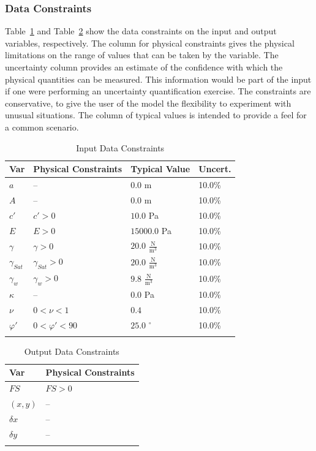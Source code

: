 \documentclass[12pt]{article}
\begin{document}
\subsubsection{Data Constraints}
\label{Sec:DataConstraints}
Table~\ref{Table:InDataConstraints} and Table~\ref{Table:OutDataConstraints} show the data constraints on the input and output variables, respectively. The column for physical constraints gives the physical limitations on the range of values that can be taken by the variable. The uncertainty column provides an estimate of the confidence with which the physical quantities can be measured. This information would be part of the input if one were performing an uncertainty quantification exercise. The constraints are conservative, to give the user of the model the flexibility to experiment with unusual situations. The column of typical values is intended to provide a feel for a common scenario.
\begin{longtable}{l l l l}
\toprule
Var & Physical Constraints & Typical Value & Uncert.
\\
\midrule
$a$ & -- & $0.0$ m & 10.0\%
\\
$A$ & -- & $0.0$ m & 10.0\%
\\
$c'$ & $c'>0$ & $10.0$ Pa & 10.0\%
\\
$E$ & $E>0$ & $15000.0$ Pa & 10.0\%
\\
$γ$ & $γ>0$ & $20.0$ $\frac{\text{N}}{\text{m}^{3}}$ & 10.0\%
\\
${γ_{Sat}}$ & ${γ_{Sat}}>0$ & $20.0$ $\frac{\text{N}}{\text{m}^{3}}$ & 10.0\%
\\
${γ_{w}}$ & ${γ_{w}}>0$ & $9.8$ $\frac{\text{N}}{\text{m}^{3}}$ & 10.0\%
\\
$κ$ & -- & $0.0$ Pa & 10.0\%
\\
$ν$ & $0<ν<1$ & $0.4$ & 10.0\%
\\
$φ'$ & $0<φ'<90$ & $25.0$ ${}^{\circ}$ & 10.0\%
\\
\bottomrule
\caption{Input Data Constraints}
\label{Table:InDataConstraints}
\end{longtable}
\begin{longtable}{l l}
\toprule
Var & Physical Constraints
\\
\midrule
$FS$ & $FS>0$
\\
$(x,y)$ & --
\\
$δx$ & --
\\
$δy$ & --
\\
\bottomrule
\caption{Output Data Constraints}
\label{Table:OutDataConstraints}
\end{longtable}
\end{document}

